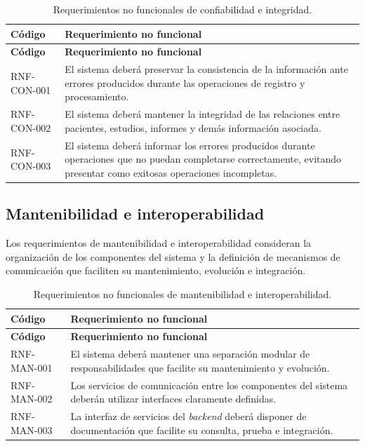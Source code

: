 \begin{longtable}{|p{}|p{}|}
    \caption{Requerimientos no funcionales de confiabilidad e integridad.}
    \label{tab:rnf-confiabilidad}\\
    \hline
    \textbf{Código} & \textbf{Requerimiento no funcional} \\
    \hline
    \endfirsthead

    \hline
    \textbf{Código} & \textbf{Requerimiento no funcional} \\
    \hline
    \endhead

    RNF-CON-001 &
    El sistema deberá preservar la consistencia de la información ante errores
    producidos durante las operaciones de registro y procesamiento. \\
    \hline

    RNF-CON-002 &
    El sistema deberá mantener la integridad de las relaciones entre pacientes,
    estudios, informes y demás información asociada. \\
    \hline

    RNF-CON-003 &
    El sistema deberá informar los errores producidos durante operaciones que
    no puedan completarse correctamente, evitando presentar como exitosas
    operaciones incompletas. \\
    \hline
\end{longtable}


\subsection{Mantenibilidad e interoperabilidad}
\label{subsec:rnf-mantenibilidad}

Los requerimientos de mantenibilidad e interoperabilidad consideran la
organización de los componentes del sistema y la definición de mecanismos de
comunicación que faciliten su mantenimiento, evolución e integración.

\begin{longtable}{|p{}|p{}|}
    \caption{Requerimientos no funcionales de mantenibilidad e interoperabilidad.}
    \label{tab:rnf-mantenibilidad}\\
    \hline
    \textbf{Código} & \textbf{Requerimiento no funcional} \\
    \hline
    \endfirsthead

    \hline
    \textbf{Código} & \textbf{Requerimiento no funcional} \\
    \hline
    \endhead

    RNF-MAN-001 &
    El sistema deberá mantener una separación modular de responsabilidades que
    facilite su mantenimiento y evolución. \\
    \hline

    RNF-MAN-002 &
    Los servicios de comunicación entre los componentes del sistema deberán
    utilizar interfaces claramente definidas. \\
    \hline

    RNF-MAN-003 &
    La interfaz de servicios del \textit{backend} deberá disponer de documentación que
    facilite su consulta, prueba e integración. \\
    \hline
\end{longtable}


